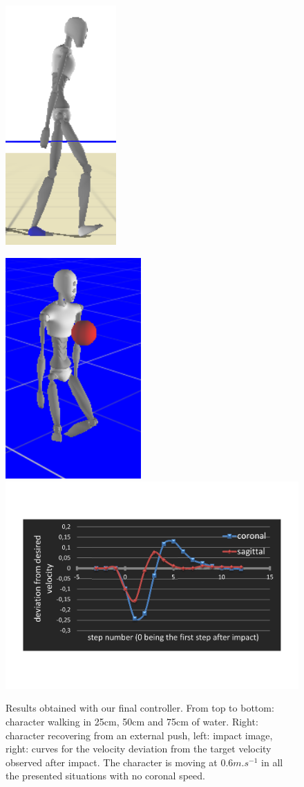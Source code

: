 \documentclass[runningheads,a4paper,10pt]{llncs}
\begin{document}
\begin{figure}[t]
\begin{minipage}{0.4\columnwidth}
\includegraphics[width=0.101\columnwidth]{images/strips/0_75/8.png}
\end{minipage}
\begin{minipage}{0.55\columnwidth}
\includegraphics[scale=0.28]{images/strips/ball/img_impact.png}
\includegraphics[scale=0.255]{images/strips/ball/speed_evo_after_impact.pdf}
\end{minipage}

\caption{Results obtained with our final controller. From top to bottom: character walking in 25cm, 50cm and 75cm of water. Right: character recovering from an external push, left: impact image, right: curves for the velocity deviation from the target velocity observed after impact. The character is moving at $0.6m.s^{-1}$ in all the presented situations with no coronal speed.}
\label{fig:controller_results}
\end{figure}
\end{document}
